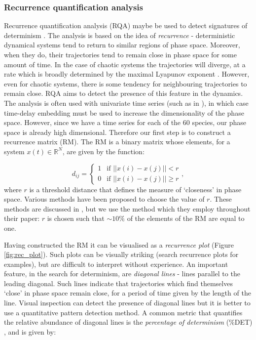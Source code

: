 \subsubsection{Recurrence quantification analysis}
\label{sec:rqa}      

Recurrence quantification analysis (RQA) maybe be used to detect signatures of determinism \cite{marwan2007recurrence,aparicio2008detecting,saul09phd}. The analysis is based on the idea of \emph{recurrence} - deterministic dynamical systems tend to return to similar regions of phase space. Moreover, when they do, their trajectories tend to remain close in phase space for some amount of time. In the case of chaotic systems the trajectories will diverge, at a rate which is broadly determined by the maximal Lyapunov exponent \cite{saul09phd}. However, even for chaotic systems, there is some tendency for neighbouring trajectories to remain close. RQA aims to detect the presence of this feature in the dynamics. The analysis is often used with univariate time series (such as in \cite{saul09phd}), in which case time-delay embedding must be used to increase the dimensionality of the phase space. However, since we have a time series for each of the 60 species, our phase space is already high dimensional. Therefore our first step is to construct a recurrence matrix (RM). The RM is a binary matrix whose elements, for a system $x(t) \in \mathbb{R}^N$, are given by the function:

\begin{equation}
d_{ij} = \begin{cases} 1 &\mbox{if } ||x(i)-x(j)||<r \\
0 & \mbox{if } ||x(i)-x(j)|| \geq r \end{cases},
\label{eq:rm}
\end{equation}
%
where $r$ is a threshold distance that defines the measure of `closeness' in phase space. Various methods have been proposed to choose the value of $r$. These methods are discussed in \cite{aparicio2008detecting}, but we use the method which they employ throughout their paper: $r$ is chosen such that $\sim 10\%$ of the elements of the RM are equal to one.

Having constructed the RM it can be visualised as a \emph{recurrence plot} (Figure \ref{fig:rec_plot}). Such plots can be visually striking (search recurrence plots for examples), but are difficult to interpret without experience. An important feature, in the search for determinism, are \emph{diagonal lines} - lines parallel to the leading diagonal. Such lines indicate that trajectories which find themselves `close' in phase space remain close, for a period of time given by the length of the line. Visual inspection can detect the presence of diagonal lines but it is better to use a quantitative pattern detection method. A common metric that quantifies the relative abundance of diagonal lines is the \emph{percentage of determinism} ($\%$DET) \cite{aparicio2008detecting,marwan2007recurrence}, and is given by:

